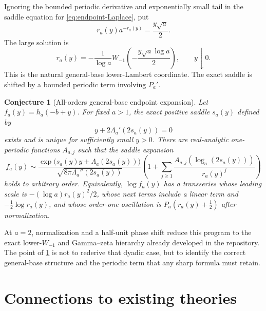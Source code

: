 \documentclass[11pt,oneside]{article}
\newtheorem{conjecture}[theorem]{Conjecture}
\theoremstyle{definition}
\theoremstyle{remark}
\begin{document}
Ignoring the bounded periodic derivative and exponentially small tail in the saddle equation
for \eqref{eq:endpoint-Laplace}, put
\begin{equation}
 r_a(y)a^{-r_a(y)}=\frac{y\sqrt a}{2}.
 \label{eq:r-Lambert-equation}
\end{equation}
The large solution is
\begin{equation}
 r_a(y)=-\frac1{\log a}
 W_{-1}\!\left(-\frac{y\sqrt a\log a}{2}\right),
 \qquad y\downarrow0.
 \label{eq:r-Lambert}
\end{equation}
This is the natural general-base lower-Lambert coordinate.  The exact saddle is shifted by a
bounded periodic term involving $P_a'$.

\begin{conjecture}[All-orders general-base endpoint expansion]
\label{conj:endpoint-all-orders}
Let $f_a(y)=h_a(-b+y)$.  For fixed $a>1$, the exact positive saddle $s_a(y)$ defined by
\begin{equation}
 y+2\Lambda_a'(2s_a(y))=0
 \label{eq:exact-saddle}
\end{equation}
exists and is unique for sufficiently small $y>0$.  There are real-analytic one-periodic
functions $A_{a,j}$ such that the saddle expansion
\begin{equation}
 f_a(y)\sim
 \frac{\exp\!\bigl(s_a(y)y+\Lambda_a(2s_a(y))\bigr)}
      {\sqrt{8\pi\Lambda_a''(2s_a(y))}}
 \left(1+\sum_{j\ge1}\frac{A_{a,j}(\log_a(2s_a(y)))}{r_a(y)^j}\right)
 \label{eq:general-saddle-conjecture}
\end{equation}
holds to arbitrary order.  Equivalently, $\log f_a(y)$ has a transseries whose leading scale
is $-(\log a)r_a(y)^2/2$, whose next terms include a linear term and
$-\tfrac12\log r_a(y)$, and whose order-one oscillation is
$P_a(r_a(y)+\tfrac12)$ after normalization.
\end{conjecture}

At $a=2$, normalization and a half-unit phase shift reduce this program to the exact
lower-$W_{-1}$ and Gamma--zeta hierarchy already developed in the repository.  The point of
\cref{conj:endpoint-all-orders} is not to rederive that dyadic case, but to identify the
correct general-base structure and the periodic term that any sharp formula must retain.

\section{Connections to existing theories}
\label{sec:connections}
\end{document}
